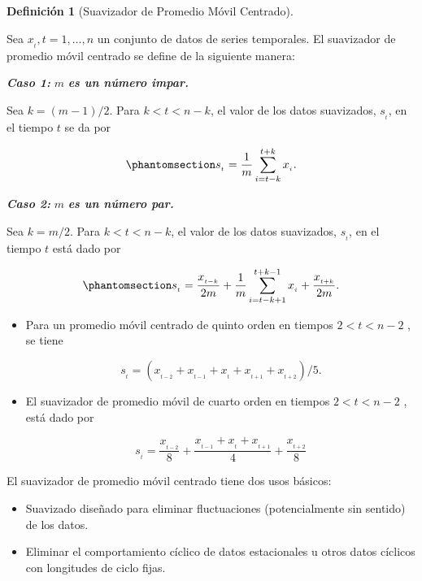 \documentclass[
  us-letterpaper,
]{scrreprt}
\theoremstyle{plain}
\theoremstyle{definition}
\newtheorem{definition}{Definición}[chapter]
\theoremstyle{definition}
\theoremstyle{plain}
\theoremstyle{remark}
\begin{document}
\begin{definition}[Suavizador de Promedio Móvil
Centrado]\protect\hypertarget{def-CMAS}{}\label{def-CMAS}

Sea \(x_{_t}, t=1,\ldots,n\) un conjunto de datos de series temporales.
El suavizador de promedio móvil centrado se define de la siguiente
manera:

\textbf{\emph{Caso 1:}} \(m\) \textbf{\emph{es un número impar.}}

Sea \(k= (m−1)/2\). Para \(k <t< n - k\), el valor de los datos
suavizados, \(s_{_t}\), en el tiempo \(t\) se da por

\begin{equation}\phantomsection\label{eq-mimpar}{
s_{_t}=\frac{1}{m}\sum_{i=t-k}^{t+k}x_{_i}.
}\end{equation}

\textbf{\emph{Caso 2:}} \(m\) \textbf{\emph{es un número par.}}

Sea \(k= m/2\). Para \(k <t< n - k\), el valor de los datos suavizados,
\(s_{_t}\), en el tiempo \(t\) está dado por

\begin{equation}\phantomsection\label{eq-mpar}{
s_{_t}= \frac{x_{_{t-k}}}{2m}+\frac{1}{m}\sum_{i=t-k+1}^{t+k-1}x_{_i}+\frac{x_{_{t+k}}}{2m}.
}\end{equation}

\end{definition}

\begin{tcolorbox}[enhanced jigsaw, breakable, colbacktitle=quarto-callout-caution-color!10!white, rightrule=.15mm, toptitle=1mm, colback=white, left=2mm, colframe=quarto-callout-caution-color-frame, bottomtitle=1mm, opacitybacktitle=0.6, leftrule=.75mm, arc=.35mm, title={Ejemplos}, coltitle=black, titlerule=0mm, opacityback=0, bottomrule=.15mm, toprule=.15mm]

\begin{itemize}
\item
  Para un promedio móvil centrado de quinto orden en tiempos
  \(2 <t < n -2\) , se tiene

  \[
  s_{_t}=(x_{_{t-2}}+x_{_{t-1}}+x_{_t}+x_{_{t+1}}+x_{_{t+2}})/5.
  \]
\item
  El suavizador de promedio móvil de cuarto orden en tiempos
  \(2 <t < n -2\) , está dado por

  \[
  s_{_t}=\frac{x_{_{t-2}}}{8}+\frac{x_{_{t-1}}+x_{_t}+x_{_{t+1}}}{4}+\frac{x_{_{t+2}}}{8}
  \]
\end{itemize}

El suavizador de promedio móvil centrado tiene dos usos básicos:

\begin{itemize}
\item
  Suavizado diseñado para eliminar fluctuaciones (potencialmente sin
  sentido) de los datos.
\item
  Eliminar el comportamiento cíclico de datos estacionales u otros datos
  cíclicos con longitudes de ciclo fijas.
\end{itemize}

\end{tcolorbox}
\end{document}
